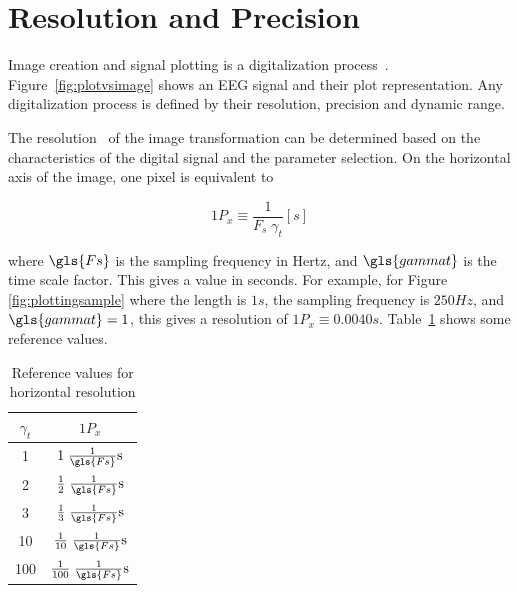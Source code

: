 \section{Resolution and Precision}

Image creation and signal plotting is a digitalization process~\cite{Schomer2010}.  Figure~\ref{fig:plotvsimage} shows an EEG signal and their plot representation.  Any digitalization process is defined by their resolution, precision and dynamic range.

The resolution~\cite{Cohen2014} of the image transformation can be determined based on the characteristics of the digital signal and the parameter selection. On the horizontal axis of the image, one pixel is equivalent to 

\begin{equation}
1 P_x \equiv \frac{1}{F_s  \; \gamma_t}  [\si{s}]
\label{eq:resolutionx}
\end{equation}

\noindent where $\gls{Fs}$ is the sampling frequency in Hertz, and $\gls{gammat}$ is the time scale factor.  This gives a value in seconds.  For example, for Figure \ref{fig:plottingsample} where the length is $1 s$, the sampling frequency is $250 Hz$, and $\gls{gammat}= 1$, this gives a resolution of $1 P_x \equiv 0.0040 \si{s}$. Table~\ref{tab:precisionx} shows some reference values.

\begin{table}[htb]
\caption[Reference Values for Horizontal Resolution]{Reference values for horizontal resolution}
\centering
\vspace{8pt}
\begin{tabular}{|c|c|}
\toprule
\textbf{$\gamma_t$}	&  $1 P_x$  \\
\midrule
 1    &     $1 \; \frac{1}{\gls{Fs}} \si{s}$    \\
 2    &     $\frac{1}{2} \; \frac{1}{\gls{Fs}} \si{s}$    \\
 3    &     $\frac{1}{3} \;  \frac{1}{\gls{Fs}} \si{s}$    \\
 10   &     $\frac{1}{10} \; \frac{1}{\gls{Fs}} \si{s}$    \\
 100 &     $\frac{1}{100} \; \frac{1}{\gls{Fs}} \si{s}$    \\
\bottomrule
\end{tabular}
\label{tab:precisionx}
\end{table}

